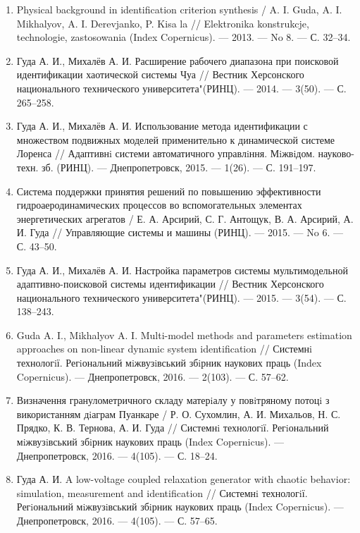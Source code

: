 \begin{enumerate}
\item
Physical background in identification criterion synthesis / A. I. Guda, A. I. Mikhalyov,
A. I. Derevjanko, P. Kisa la // Elektronika konstrukcje, technologie, zastosowania (Index
Copernicus). --- 2013. --- No 8. --- С. 32--34.

\item
Гуда А. И., Михалёв А. И. Расширение рабочего диапазона при поисковой идентификации
хаотической системы Чуа // Вестник Херсонского национального технического
университета"(РИНЦ). --- 2014. --- 3(50). --- С. 265--258.

\item
Гуда А. И., Михалёв А. И. Использование метода идентификации с множеством
подвижных моделей применительно к динамической системе Лоренса // Адаптивнi системи
автоматичного управлiння. Мiжвiдом. науково-техн. зб. (РИНЦ). --- Днепропетровск, 2015.
--- 1(26). --- С. 191--197.

\item
Система поддержки принятия решений по повышению эффективности гидроаеродинамических
процессов во вспомогательных элементах энергетических агрегатов /
Е. А. Арсирий, С. Г. Антощук, В. А. Арсирий, А. И. Гуда // Управляющие системы и машины (РИНЦ).
--- 2015. --- No 6. --- С. 43--50.

\item
Гуда А. И., Михалёв А. И. Настройка параметров системы мультимодельной
адаптивно-поисковой системы идентификации // Вестник Херсонского национального
технического университета"(РИНЦ). --- 2015. --- 3(54). --- С. 138--243.

\item
Guda A. I., Mikhalyov A. I. Multi-model methods and parameters estimation approaches
on non-linear dynamic system identification // Системнi технологiї. Регiональний мiжвузiвський
збiрник наукових праць (Index Copernicus). --- Днепропетровск, 2016. --- 2(103). --- С. 57--62.

\item
Визначення гранулометричного складу матерiалу у повiтряному потоцi з використанням
дiаграм Пуанкаре / Р. О. Сухомлин, А. И. Михальов, Н. С. Прядко, К. В. Тернова, А. И. Гуда
// Системнi технологiї. Регiональний мiжвузiвський збiрник наукових
праць (Index Copernicus). --- Днепропетровск, 2016. --- 4(105). --- С. 18--24.

\item
Гуда А. И. A low-voltage coupled relaxation generator with chaotic behavior: simulation,
measurement and identification // Системнi технологiї. Регiональний мiжвузiвський
збiрник наукових праць (Index Copernicus). --- Днепропетровск, 2016. --- 4(105). --- С. 57--65.


\end{enumerate}
